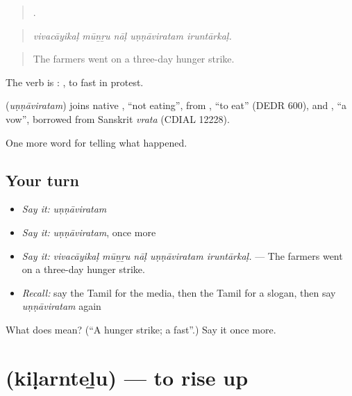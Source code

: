 \begin{quote}
    .
\end{quote}

\begin{quote}
\emph{vivacāyikaḷ mūṉṟu nāḷ uṇṇāviratam iruntārkaḷ.}
\end{quote}

\begin{quote}
The farmers went on a three-day hunger strike.
\end{quote}

The verb is :  , to fast in protest.

\begin{cousinweb}
\textbf{} (\emph{uṇṇāviratam}) joins native , \textquotedblleft{}not eating\textquotedblright{}, from , \textquotedblleft{}to eat\textquotedblright{} (DEDR 600), and , \textquotedblleft{}a vow\textquotedblright{}, borrowed from Sanskrit \emph{vrata} (CDIAL 12228).
\end{cousinweb}

\begin{grammarlens}[title={What you've built}]
One more word for telling what happened.
\end{grammarlens}

\subsection*{Your turn}
\begin{itemize}
\raggedright
  \item \emph{Say it:} \emph{uṇṇāviratam}
  \item \emph{Say it:} \emph{uṇṇāviratam}, once more
  \item \emph{Say it:} \emph{vivacāyikaḷ mūṉṟu nāḷ uṇṇāviratam iruntārkaḷ.} — The farmers went on a three-day hunger strike.
  \item \emph{Recall:} say the Tamil for the media, then the Tamil for a slogan, then say \emph{uṇṇāviratam} again
\end{itemize}

\begin{tcolorbox}[breakable,colback=teal!4,colframe=teal!35!black,title={Before you move on}]
What does  mean? (\textquotedblleft{}A hunger strike; a fast\textquotedblright{}.) Say it once more.
\end{tcolorbox}
\section[\texorpdfstring{\ta{கிளர்ந்தெழு} (kiḷarnteḻu)}{கிளர்ந்தெழு (kiḷarnteḻu)}]{ (kiḷarnteḻu) — to rise up}

